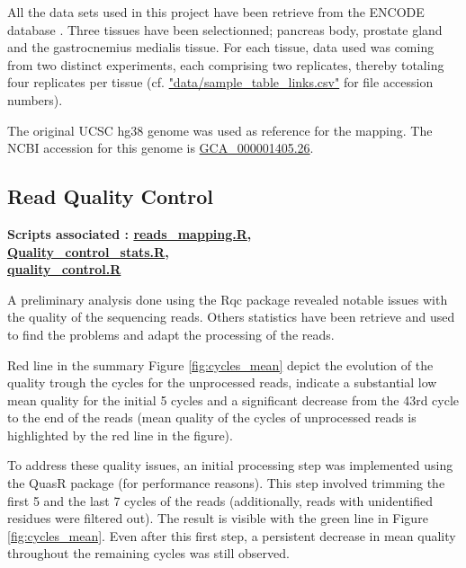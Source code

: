 \documentclass[a4paper, 11pt]{article}
\begin{document}
\begin{multicols}{2}
All the data sets used in this project have been retrieve from the ENCODE database \citep{luo2020new}.
Three tissues have been selectionned; pancreas body, prostate gland and the gastrocnemius medialis tissue.
For each tissue, data used was coming from two distinct experiments, each comprising two replicates, thereby totaling four replicates per tissue (cf. \href{https://github.com/leopoldguyot/BINF-402_Transcriptomic_Project/blob/data/sample_table_links.csv}{"data/sample\_table\_links.csv"} for file accession numbers).

The original UCSC hg38 genome was used as reference for the mapping. The NCBI accession for this genome is \href{https://www.ncbi.nlm.nih.gov/datasets/genome/GCF_000001405.26/}{GCA\_000001405.26}.


\subsection{Read Quality Control}
\begin{scriptsize}
	 \textbf{Scripts associated : \href{https://github.com/leopoldguyot/BINF-402_Transcriptomic_Project/blob/main/reads_mapping.R}{reads\_mapping.R},\\
	 	  \href{https://github.com/leopoldguyot/BINF-402_Transcriptomic_Project/blob/main/Quality_control_stats.R}{Quality\_control\_stats.R}, \\
	 	  \href{https://github.com/leopoldguyot/BINF-402_Transcriptomic_Project/blob/main/quality_control.R}{quality\_control.R}}
\end{scriptsize}


A preliminary analysis done using the Rqc package \citep{Rqc} revealed notable issues with the quality of the sequencing reads. Others statistics have been retrieve and used to find the problems and adapt the processing of the reads. 

Red line in the summary Figure \ref{fig:cycles_mean} depict the evolution of the quality trough the cycles for the unprocessed reads, indicate a substantial low mean quality for the initial 5 cycles and a significant decrease from the 43rd cycle to the end of the reads (mean quality of the cycles of unprocessed reads is highlighted by the red line in the figure).

To address these quality issues, an initial processing step was implemented using the QuasR package \citep{QuasR} (for performance reasons). This step involved trimming the first 5 and the last 7 cycles of the reads (additionally, reads with unidentified residues were filtered out). The result is visible with the green line in Figure \ref{fig:cycles_mean}. Even after this first step, a persistent decrease in mean quality throughout the remaining cycles was still observed.


\end{multicols}
\end{document}
